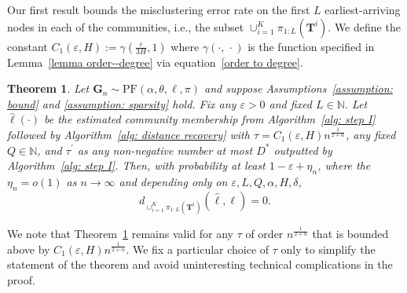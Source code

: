 \documentclass[twoside,11pt]{article}
\newtheorem{thy}[theorem]{Theorem}
\theoremstyle{remark}
\begin{document}
Our first result bounds the misclustering error rate on the first $L$ earliest-arriving nodes in each of the communities, i.e., the subset $\cup_{i=1}^K \pi_{1:L}\left(\bm{T}^i\right)$. We define the constant $C_1(\varepsilon, H) := \gamma(\frac{\varepsilon}{3H}, 1)$ where $\gamma(\cdot, \, \cdot)$ is the function specified in Lemma~\ref{lemma order--degree} via equation~\eqref{order to degree}. 


\begin{thy}
\label{thm: first L}
Let $\boldsymbol{G}_n \sim \mathrm{PF}(\alpha, \theta, \ell, \pi)$ and suppose Assumptions~\ref{assumption: bound} and \ref{assumption: sparsity} hold. 
Fix any $\varepsilon > 0$ and fixed $L\in \mathbb{N}$. Let $\hat{\ell}(\cdot)$ be the estimated community membership from Algorithm~\ref{alg: step I} followed by Algorithm~\ref{alg: distance recovery} with $\tau = C_1(\varepsilon, H) n^{\frac{1}{2+\alpha}}$, any fixed $Q\in\mathbb{N}$, and $\tau^\prime$ as any non-negative number at most $D^*$ outputted by Algorithm~\ref{alg: step I}. 
Then, with probability at least $1-\varepsilon + \eta_n$, where the $\eta_n = o(1)$ as $n \rightarrow \infty$ and depending only on $\varepsilon, L, Q, \alpha, H, \delta$,
%
\begin{equation}
\label{thm: first L eqn 1}
d_{\cup_{i=1}^K \pi_{1:L}\left(\bm{T}^i\right)}(\hat{\ell}, \ell) = 0.
\end{equation}
%
\end{thy}

We note that Theorem~\ref{thm: first L} remains valid for any $\tau$ of order $n^{\frac{1}{2+\alpha}}$ that is bounded above by $C_1(\varepsilon, H) n^{\frac{1}{2+\alpha}}$.
We fix a particular choice of $\tau$ only to simplify the statement of the theorem and avoid uninteresting technical complications in the proof. 
\end{document}
